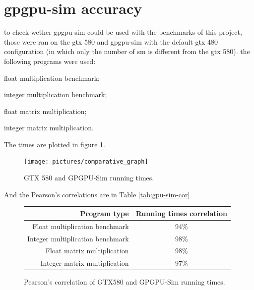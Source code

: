 \documentclass{report}
\begin{document}
    \section{gpgpu-sim accuracy}
        to check wether gpgpu-sim could be used with the benchmarks of this project, those were ran on the gtx 580 and gpgpu-sim with the default gtx 480 configuration (in which
        only the number of sm is different from the gtx 580). the following programs were used:
        \item float multiplication benchmark;
        \item integer multiplication benchmark;
        \item float matrix multiplication;
        \item integer matrix multiplication.

        The times are plotted in figure \ref{fig:gpu-sim-corr}.
        \begin{figure}[H]
        \centering
            \texttt{[image: pictures/comparative\_graph]}
            \captionsetup{justification=centering}
            \caption{GTX 580 and GPGPU-Sim running times.}
            \label{fig:gpu-sim-corr}
    \end{figure}

        

        And the Pearson's correlations are in Table \ref{tab:gpu-sim-cor}
        \begin{figure}[H]
        \centering
            \begin{tabular}{ | r | c | }
                \hline
                Program type & Running times correlation \\ \hline
                Float multiplication benchmark & 94\% \\
                Integer multiplication benchmark & 98\% \\
                Float matrix multiplication & 98\% \\
                Integer matrix multiplication & 97\% \\
            \end{tabular}
        \captionsetup{justification=centering}
        \caption{Pearson's correlation of GTX580 and GPGPU-Sim running times.}
        \label{tab:gpu-sim-corr}
        \end{figure}
\end{document}
